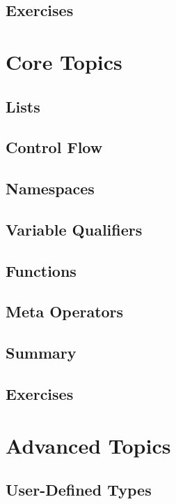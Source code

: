 \documentclass[oneside]{book}
\begin{document}
\section{Exercises}
\blindtext

\chapter{Core Topics}
\blindtext

\section{Lists}

\section{Control Flow}
\blindtext

\section{Namespaces}
\blindtext

\section{Variable Qualifiers}
\blindtext

\section{Functions}
\blindtext

\section{Meta Operators}
\blindtext

\section{Summary}
\blindtext

\section{Exercises}
\blindtext

\chapter{Advanced Topics}
\blindtext

\section{User-Defined Types}
\blindtext
\end{document}
